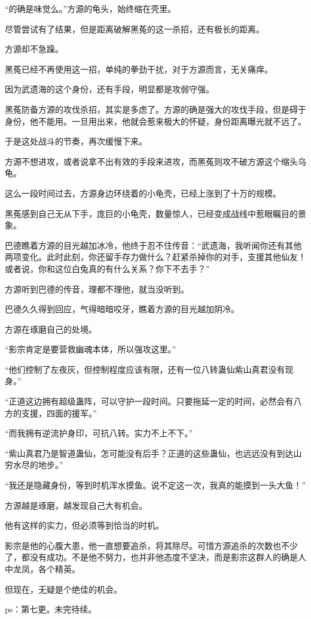 \begin{this_body}
“的确是味觉么。”方源的龟头，始终缩在壳里。

尽管尝试有了结果，但是距离破解黑菟的这一杀招，还有极长的距离。

方源却不急躁。

黑菟已经不再使用这一招，单纯的拳劲干扰，对于方源而言，无关痛痒。

因为武遗海的这个身份，还有手段，明显都是攻弱守强。

黑菟防备方源的攻伐杀招，其实是多虑了。方源的确是强大的攻伐手段，但是碍于身份，他不能用。一旦用出来，他就会惹来极大的怀疑，身份距离曝光就不远了。

于是这处战斗的节奏，再次缓慢下来。

方源不想进攻，或者说拿不出有效的手段来进攻，而黑菟则攻不破方源这个缩头乌龟。

这么一段时间过去，方源身边环绕着的小龟壳，已经上涨到了十万的规模。

黑菟感到自己无从下手，庞巨的小龟壳，数量惊人，已经变成战线中惹眼瞩目的景象。

巴德瞧着方源的目光越加冰冷，他终于忍不住传音：“武遗海，我听闻你还有其他两项变化。此时此刻，你还留手存力做什么？赶紧杀掉你的对手，支援其他仙友！或者说，你和这位白兔真的有什么关系？你下不去手？”

方源听到巴德的传音，理都不理他，就当没听到。

巴德久久得到回应，气得暗暗咬牙，瞧着方源的目光越加阴冷。

方源在琢磨自己的处境。

“影宗肯定是要营救幽魂本体，所以强攻这里。”

“他们控制了左夜灰，但控制程度应该有限，还有一位八转蛊仙紫山真君没有现身。”

“正道这边拥有超级蛊阵，可以守护一段时间。只要拖延一定的时间，必然会有八方的支援，四面的援军。”

“而我拥有逆流护身印，可抗八转。实力不上不下。”

“紫山真君乃是智道蛊仙，怎可能没有后手？正道的这些蛊仙，也远远没有到达山穷水尽的地步。”

“我还是隐藏身份，等到时机浑水摸鱼。说不定这一次，我真的能摸到一头大鱼！”

方源越是琢磨，越发现自己大有机会。

他有这样的实力，但必须等到恰当的时机。

影宗是他的心腹大患，他一直想要追杀，将其除尽。可惜方源追杀的次数也不少了，都没有成功。不是他不努力，也并非他态度不坚决，而是影宗这群人的确是人中龙凤，各个精英。

但现在，无疑是个绝佳的机会。

ps：第七更。未完待续。

\end{this_body}
